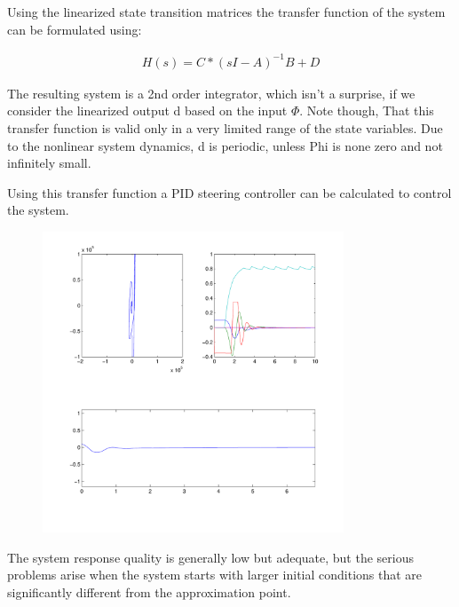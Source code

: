 Using the linearized state transition matrices the transfer function of the system can be formulated using:

\begin{align}
	H(s) = C*(sI - A)^{-1}B + D
\end{align}

The resulting system is a 2nd order integrator, which isn’t a surprise, if we consider the linearized output d based on the input $\Phi$. Note though, That this transfer function is valid only in a very limited range of the state variables. Due to the nonlinear system dynamics, d is periodic, unless Phi is none zero and not infinitely small.

Using this transfer function a PID steering controller can be calculated to control the system.

\begin{figure}[H]
	\centering
	\includegraphics[width=0.8\textwidth]{img2/PI01}
	\caption{}
	\label{}
\end{figure}

The system response quality is generally low but adequate, but the serious problems arise when the system starts with larger initial conditions that are significantly different from the approximation point.

